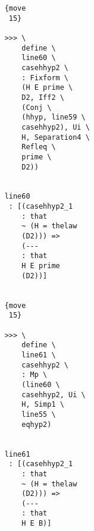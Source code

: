 \documentclass[12pt]{article}
\begin{document}
\begin{verbatim}
                                                {move 
                                                 15}

                                                >>> \
                                                    define \
                                                    line60 \
                                                    casehhyp2 \
                                                    : Fixform \
                                                    (H E prime \
                                                    D2, Iff2 \
                                                    (Conj \
                                                    (hhyp, line59 \
                                                    casehhyp2), Ui \
                                                    H, Separation4 \
                                                    Refleq \
                                                    prime \
                                                    D2))


                                                line60 
                                                 : [(casehhyp2_1 
                                                    : that 
                                                    ~ (H = thelaw 
                                                    (D2))) => 
                                                    (--- 
                                                    : that 
                                                    H E prime 
                                                    (D2))]


                                                {move 
                                                 15}

                                                >>> \
                                                    define \
                                                    line61 \
                                                    casehhyp2 \
                                                    : Mp \
                                                    (line60 \
                                                    casehhyp2, Ui \
                                                    H, Simp1 \
                                                    line55 \
                                                    eqhyp2)


                                                line61 
                                                 : [(casehhyp2_1 
                                                    : that 
                                                    ~ (H = thelaw 
                                                    (D2))) => 
                                                    (--- 
                                                    : that 
                                                    H E B)]



\end{verbatim}
\end{document}
